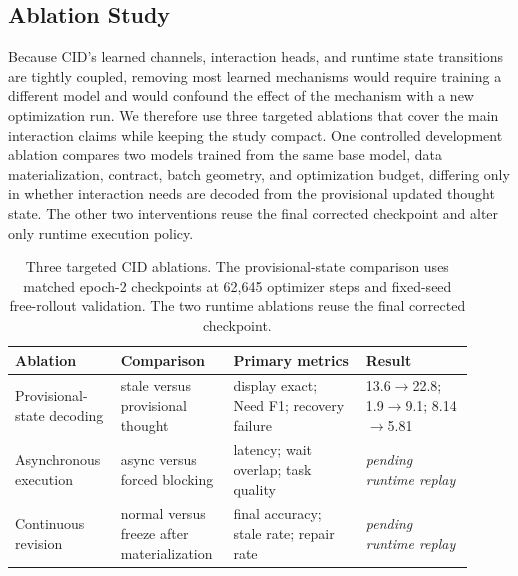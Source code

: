 \subsection{Ablation Study}
\label{sec:ablations}

Because CID's learned channels, interaction heads, and runtime state transitions are tightly coupled, removing most learned mechanisms would require training a different model and would confound the effect of the mechanism with a new optimization run. We therefore use three targeted ablations that cover the main interaction claims while keeping the study compact. One controlled development ablation compares two models trained from the same base model, data materialization, contract, batch geometry, and optimization budget, differing only in whether interaction needs are decoded from the provisional updated thought state. The other two interventions reuse the final corrected checkpoint and alter only runtime execution policy.

\begin{table}[t]
  \centering
  \scriptsize
  \setlength{\tabcolsep}{2.5pt}
  \begin{tabular}{p{0.20\linewidth}p{0.22\linewidth}p{0.27\linewidth}p{0.22\linewidth}}
    \toprule
    Ablation & Comparison & Primary metrics & Result \\
    \midrule
    Provisional-state decoding & stale versus provisional thought & display exact; Need F1; recovery failure & 13.6$\rightarrow$22.8; 1.9$\rightarrow$9.1; 8.14$\rightarrow$5.81 \\
    Asynchronous execution & async versus forced blocking & latency; wait overlap; task quality & \textit{pending runtime replay} \\
    Continuous revision & normal versus freeze after materialization & final accuracy; stale rate; repair rate & \textit{pending runtime replay} \\
    \bottomrule
  \end{tabular}
  \caption{Three targeted CID ablations. The provisional-state comparison uses matched epoch-2 checkpoints at 62,645 optimizer steps and fixed-seed free-rollout validation. The two runtime ablations reuse the final corrected checkpoint.}
  \label{tab:cid-ablation}
\end{table}

